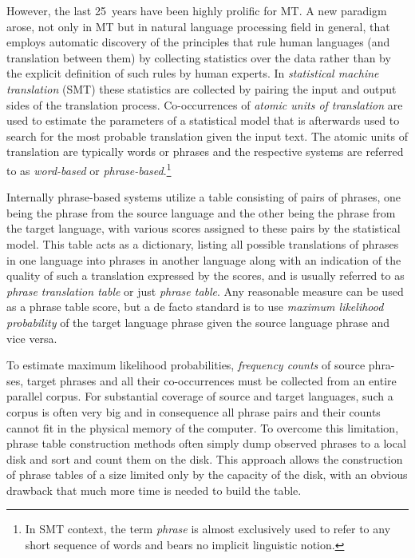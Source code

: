 However, the last 25~years have been highly prolific for MT.
A new paradigm arose, not only in MT but in natural language processing
field in general, that employs automatic discovery of the principles that
rule human languages (and translation between them) by collecting
statistics over the data rather than by the explicit definition of such rules
by human experts.
In \emph{statistical machine translation} (SMT) these statistics are
collected by pairing the input and output sides of the translation process.
Co-occurrences of \emph{atomic units of translation} are used to
estimate the parameters of a statistical model that is afterwards used to
search for the most probable translation given the input text.
The atomic units of translation are typically words or phrases and
the respective systems are referred to as \emph{word-based} or
\emph{phrase-based}.\footnote{In SMT context, the term \emph{phrase} is almost
exclusively used to refer to any short sequence of words and bears no
implicit linguistic notion.}

Internally phrase-based systems utilize a table consisting of pairs of
phrases, one being the phrase from the source language and the other
being the phrase from the target language, with various scores assigned to
these pairs by the statistical model.
This table acts as a dictionary, listing all possible translations of phrases
in one language into phrases in another language along with an indication of
the quality of such a translation expressed by the scores, and is usually referred
to as \emph{phrase translation table} or just \emph{phrase table}.
Any reasonable measure can be used as a phrase table score, but a de facto
standard is to use \emph{maximum likelihood probability} of the target language
phrase given the source language phrase and vice versa.

To estimate maximum likelihood probabilities, \emph{frequency counts} of source
phra-ses, target phrases and all their co-occurrences must be collected from
an entire parallel corpus.
For substantial coverage of source and target languages, such a corpus is often
very big and in consequence all phrase pairs and their counts cannot fit in
the physical memory of the computer.
To overcome this limitation, phrase table construction methods often simply
dump observed phrases to a local disk and sort and count them on the disk.
This approach allows the construction of phrase tables of a size limited only by
the capacity of the disk, with an obvious drawback that much more time is
needed to build the table.

